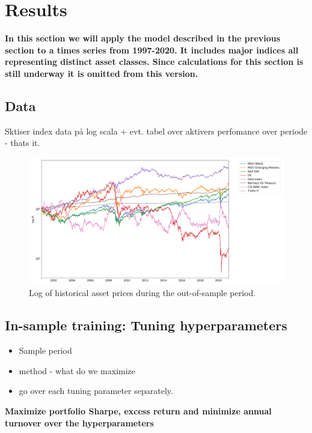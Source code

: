 \section{Results}

\textbf{In this section we will apply the model described in the previous section to a times series from 1997-2020. It includes major indices all representing distinct asset classes. Since calculations for this section is still underway it is omitted from this version.}


\subsection{Data}

Sktiser index data på log scala + evt. tabel over aktivers perfomance over periode - thats it.


\begin{figure}[H]
    \centering
    \includegraphics[width=1\textwidth]{analysis/portfolio_exercise/images/asset_vals.png}
    \caption{Log of historical asset prices during the out-of-sample period.}
    \label{fig:MPC_data}
\end{figure}


\subsection{In-sample training: Tuning hyperparameters}

\begin{itemize}
    \item Sample period
    \item method - what do we maximize
    \item go over each tuning parameter separately.
\end{itemize}

\textbf{Maximize portfolio Sharpe, excess return and minimize annual turnover over the hyperparameters}

